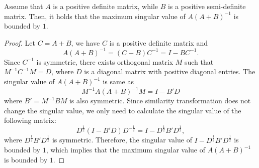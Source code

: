 \begin{lemma}\label{lem:max_singular_val}
    Assume that $A$ is a positive definite matrix, while $B$ is a positive semi-definite matrix. Then, it holds that the maximum singular value of $A(A+B)^{-1}$ is bounded by $1$.
\end{lemma}
\begin{proof}
    Let $C=A+B$, we have $C$ is a positive definite matrix and
    \[
    A(A+B)^{-1}=(C-B)C^{-1}=I-BC^{-1}.
    \]
    Since $C^{-1}$ is symmetric, there exists orthogonal matrix $M$ such that $M^{-1}C^{-1}M=D$, where $D$ is a diagonal matrix with positive diagonal entries. The singular value of $A(A+B)^{-1}$ is same as
    \[
    M^{-1}A(A+B)^{-1}M=I-B'D
    \]
    where $B'=M^{-1}BM$ is also symmetric. Since similarity transformation does not change the singular value, we only need to calculate the singular value of the following matrix:
    \[
    D^{\frac{1}{2}}(I-B'D)D^{-\frac{1}{2}}=I-D^\frac{1}{2}B'D^{\frac{1}{2}},
    \]
    where $D^\frac{1}{2}B'D^{\frac{1}{2}}$ is symmetric. Therefore, the singular value of $I-D^\frac{1}{2}B'D^{\frac{1}{2}}$ is bounded by $1$, which implies that the maximum singular value of $A(A+B)^{-1}$ is bounded by $1$.
\end{proof}